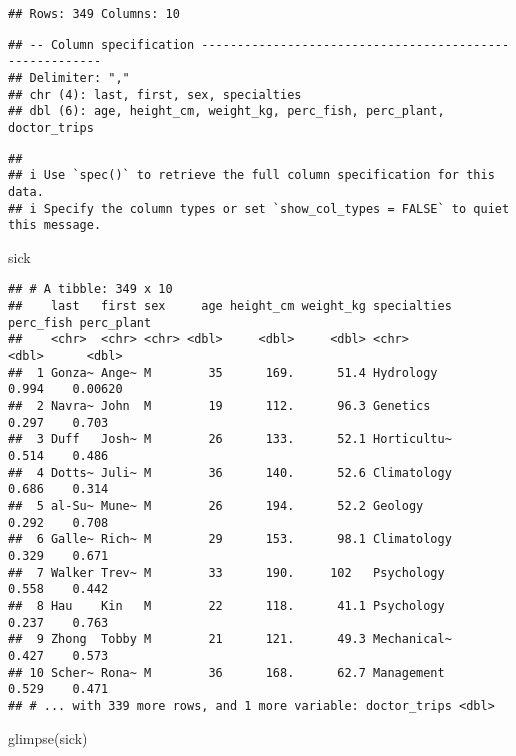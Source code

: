 \documentclass[
]{article}
\newenvironment{Shaded}{\begin{snugshade}}{\end{snugshade}}
\newcommand{\FunctionTok}[1]{\textcolor[rgb]{0.00,0.00,0.00}{#1}}
\newcommand{\NormalTok}[1]{#1}
\begin{document}
\begin{verbatim}
## Rows: 349 Columns: 10
\end{verbatim}

\begin{verbatim}
## -- Column specification --------------------------------------------------------
## Delimiter: ","
## chr (4): last, first, sex, specialties
## dbl (6): age, height_cm, weight_kg, perc_fish, perc_plant, doctor_trips
\end{verbatim}

\begin{verbatim}
## 
## i Use `spec()` to retrieve the full column specification for this data.
## i Specify the column types or set `show_col_types = FALSE` to quiet this message.
\end{verbatim}

\begin{Shaded}
\begin{Highlighting}[]
\NormalTok{sick}
\end{Highlighting}
\end{Shaded}

\begin{verbatim}
## # A tibble: 349 x 10
##    last   first sex     age height_cm weight_kg specialties perc_fish perc_plant
##    <chr>  <chr> <chr> <dbl>     <dbl>     <dbl> <chr>           <dbl>      <dbl>
##  1 Gonza~ Ange~ M        35      169.      51.4 Hydrology       0.994    0.00620
##  2 Navra~ John  M        19      112.      96.3 Genetics        0.297    0.703  
##  3 Duff   Josh~ M        26      133.      52.1 Horticultu~     0.514    0.486  
##  4 Dotts~ Juli~ M        36      140.      52.6 Climatology     0.686    0.314  
##  5 al-Su~ Mune~ M        26      194.      52.2 Geology         0.292    0.708  
##  6 Galle~ Rich~ M        29      153.      98.1 Climatology     0.329    0.671  
##  7 Walker Trev~ M        33      190.     102   Psychology      0.558    0.442  
##  8 Hau    Kin   M        22      118.      41.1 Psychology      0.237    0.763  
##  9 Zhong  Tobby M        21      121.      49.3 Mechanical~     0.427    0.573  
## 10 Scher~ Rona~ M        36      168.      62.7 Management      0.529    0.471  
## # ... with 339 more rows, and 1 more variable: doctor_trips <dbl>
\end{verbatim}

\begin{Shaded}
\begin{Highlighting}[]
\FunctionTok{glimpse}\NormalTok{(sick)}
\end{Highlighting}
\end{Shaded}
\end{document}

